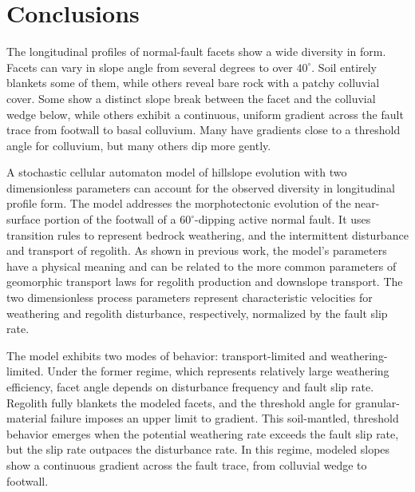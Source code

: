 


\section*{Conclusions}

The longitudinal profiles of normal-fault facets show a wide diversity in form. Facets can vary in slope angle from several degrees to over $40^\circ$. Soil entirely blankets some of them, while others reveal bare rock with a patchy colluvial cover. Some show a distinct slope break between the facet and the colluvial wedge below, while others exhibit a continuous, uniform gradient across the fault trace from footwall to basal colluvium. Many have gradients close to a threshold angle for colluvium, but many others dip more gently.

A stochastic cellular automaton model of hillslope evolution with two dimensionless parameters can account for the observed diversity in longitudinal profile form. The model addresses the morphotectonic evolution of the near-surface portion of the footwall of a $60^\circ$-dipping active normal fault. It uses transition rules to represent bedrock weathering,  and the intermittent disturbance and transport of regolith. As shown in previous work, the model's parameters have a physical meaning and can be related to the more common parameters of geomorphic transport laws for regolith production and downslope transport. The two dimensionless process parameters represent characteristic velocities for weathering and regolith disturbance, respectively, normalized by the fault slip rate.

The model exhibits two modes of behavior: transport-limited and weathering-limited. Under the former regime, which represents relatively large weathering efficiency, facet angle depends on disturbance frequency and fault slip rate. Regolith fully blankets the modeled facets, and the threshold angle for granular-material failure imposes an upper limit to gradient. This soil-mantled, threshold behavior emerges when the potential weathering rate exceeds the fault slip rate, but the slip rate outpaces the disturbance rate. In this regime, modeled slopes show a continuous gradient across the fault trace, from colluvial wedge to footwall.

